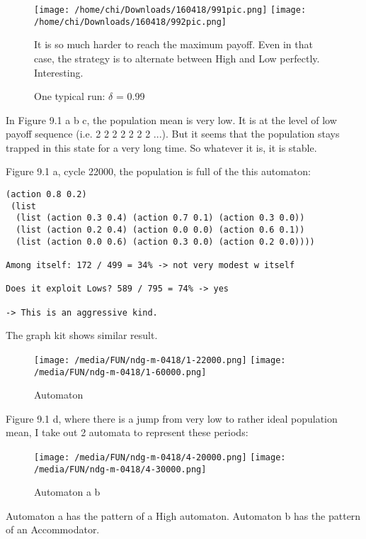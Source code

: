 \documentclass[12.5pt]{report}
\begin{document}
\begin{figure}
\texttt{[image: /home/chi/Downloads/160418/991pic.png]}
\texttt{[image: /home/chi/Downloads/160418/992pic.png]}

It is so much harder to reach the maximum payoff. Even in that case, the strategy is to alternate between High and Low perfectly. Interesting.


\caption{One typical run: $\delta$ = 0.99}
\end{figure}


In Figure 9.1 a b c, the population mean is very low. It is at the level of low payoff sequence (i.e. 2 2 2 2 2 2 2 ...). But it seems that the population stays trapped in this state for a very long time. So whatever it is, it is stable.

Figure 9.1 a, cycle 22000, the population is full of the this automaton:

\begin{verbatim}
(action 0.8 0.2)
 (list
  (list (action 0.3 0.4) (action 0.7 0.1) (action 0.3 0.0))
  (list (action 0.2 0.4) (action 0.0 0.0) (action 0.6 0.1))
  (list (action 0.0 0.6) (action 0.3 0.0) (action 0.2 0.0))))
  
Among itself: 172 / 499 = 34% -> not very modest w itself

Does it exploit Lows? 589 / 795 = 74% -> yes

-> This is an aggressive kind.
\end{verbatim}

The graph kit shows similar result.

\begin{figure}
\center
\texttt{[image: /media/FUN/ndg-m-0418/1-22000.png]}
\texttt{[image: /media/FUN/ndg-m-0418/1-60000.png]}
\caption{Automaton}
\end{figure}

Figure 9.1 d, where there is a jump from very low to rather ideal population mean, I take out 2 automata to represent these periods:

\begin{figure}
\center
\texttt{[image: /media/FUN/ndg-m-0418/4-20000.png]}
\texttt{[image: /media/FUN/ndg-m-0418/4-30000.png]}
\caption{Automaton a b}
\end{figure}

Automaton a has the pattern of a High automaton. Automaton b has the pattern of an Accommodator.
\end{document}
